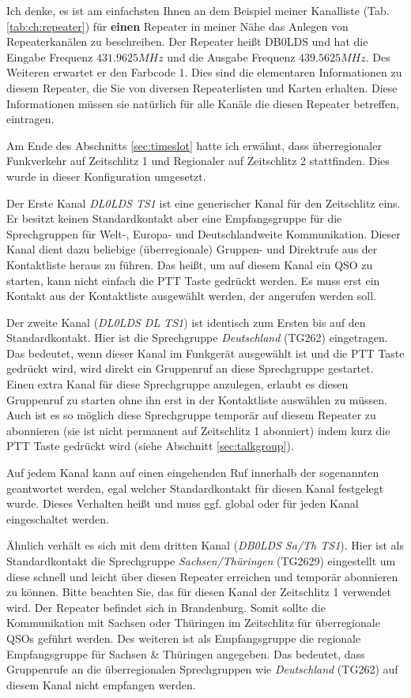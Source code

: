 Ich denke, es ist am einfachsten Ihnen an dem Beispiel meiner Kanalliste (Tab. \ref{tab:ch:repeater}) für \textbf{einen} Repeater in meiner Nähe das Anlegen von Repeaterkanälen zu beschreiben. Der Repeater heißt DB0LDS und hat die Eingabe Frequenz $431.9625 MHz$ und die Ausgabe Frequenz $439.5625 MHz$. Des Weiteren erwartet er den Farbcode 1. Dies sind die elementaren Informationen zu diesem Repeater, die Sie von diversen Repeaterlisten und Karten erhalten. Diese Informationen müssen sie natürlich für alle Kanäle die diesen Repeater betreffen, eintragen.

Am Ende des Abschnitts \ref{sec:timeslot} hatte ich erwähnt, dass überregionaler Funkverkehr auf Zeitschlitz 1 und Regionaler auf Zeitschlitz 2 stattfinden. Dies wurde in dieser Konfiguration umgesetzt. 

Der Erste Kanal \emph{DL0LDS TS1} ist eine generischer Kanal für den Zeitschlitz eins. Er besitzt keinen Standardkontakt aber eine Empfangsgruppe für die Sprechgruppen für Welt-, Europa- und Deutschlandweite Kommunikation. Dieser Kanal dient dazu beliebige (überregionale) Gruppen- und Direktrufe aus der Kontaktliste heraus zu führen. Das heißt, um auf diesem Kanal ein QSO zu starten, kann nicht einfach die PTT Taste gedrückt werden. Es muss erst ein Kontakt aus der Kontaktliste ausgewählt werden, der angerufen werden soll. 

Der zweite Kanal (\emph{DL0LDS DL TS1}) ist identisch zum Ersten bis auf den Standardkontakt. Hier ist die Sprechgruppe \emph{Deutschland} (TG262) eingetragen. Das bedeutet, wenn dieser Kanal im Funkgerät ausgewählt ist und die PTT Taste gedrückt wird, wird direkt ein Gruppenruf an diese Sprechgruppe gestartet. Einen extra Kanal für diese Sprechgruppe anzulegen, erlaubt es diesen Gruppenruf zu starten ohne ihn erst in der Kontaktliste auswählen zu müssen. Auch ist es so möglich diese Sprechgruppe temporär auf diesem Repeater zu abonnieren (sie ist nicht permanent auf Zeitschlitz 1 abonniert) indem kurz die PTT Taste gedrückt wird (siehe Abschnitt \ref{sec:talkgroup}).

\begin{merke}
 Auf jedem Kanal kann auf einen eingehenden Ruf innerhalb der sogenannten  geantwortet werden, egal welcher Standardkontakt für diesen Kanal festgelegt wurde. Dieses Verhalten heißt  und muss ggf. global oder für jeden Kanal eingeschaltet werden.
\end{merke} 

Ähnlich verhält es sich mit dem dritten Kanal (\emph{DB0LDS Sa/Th TS1}). Hier ist als Standardkontakt die Sprechgruppe \emph{Sachsen/Thüringen} (TG2629) eingestellt um diese schnell und leicht über diesen Repeater erreichen und temporär abonnieren zu können. Bitte beachten Sie, das für diesen Kanal der Zeitschlitz 1 verwendet wird. Der Repeater befindet sich in Brandenburg. Somit sollte die Kommunikation mit Sachsen oder Thüringen im Zeitschlitz für überregionale QSOs geführt werden. Des weiteren ist als Empfangsgruppe die regionale Empfangsgruppe für Sachsen \& Thüringen angegeben. Das bedeutet, dass Gruppenrufe an die überregionalen Sprechgruppen wie \emph{Deutschland} (TG262) auf diesem Kanal nicht empfangen werden.

